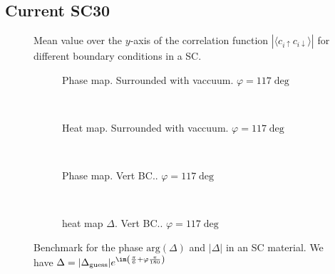 \documentclass[../main.tex]{subfiles}
\begin{document}
\subsection{Current SC30}

\begin{figure}[H]
    \centering
    
    \caption{Mean value over the $y$-axis of the correlation function $|\langle c_{i\uparrow} c_{i\downarrow}\rangle|$ for different boundary conditions in a SC.}
\end{figure}
\begin{figure}[H]
\begin{subfigure}{0.4\textwidth}
    \centering
    \hspace{-4cm} %
    
    \caption{Phase map. Surrounded with vaccuum. $\varphi = 117\deg$}
    \label{fig:first}
\end{subfigure}    \\
\begin{subfigure}{0.4\textwidth}
    \centering
    \hspace{-4cm} %
    
    \caption{Heat map. Surrounded with vaccuum. $\varphi = 117\deg$}
    \label{fig:first}
\end{subfigure}    \\
\begin{subfigure}{0.4\textwidth}
    \centering
    \hspace{-4cm} %
    
    \caption{Phase map. Vert BC.. $\varphi = 117\deg$}
    \label{fig:first}
\end{subfigure}    \\
\begin{subfigure}{0.4\textwidth}
    \centering
    \hspace{-4cm} %
    
    \caption{heat map $\Delta$. Vert BC.. $\varphi = 117\deg$}
    \label{fig:first}
\end{subfigure}    
\caption{Benchmark for the phase $\text{arg}(\Delta)$ and $|\Delta|$ in an SC material. We have $\Delta = |\Delta_{\text{guess}}|e^{\im \left(\frac{\pi}{6} + \varphi\frac{\pi}{180}\right)}$}

\end{figure}
\end{document}
